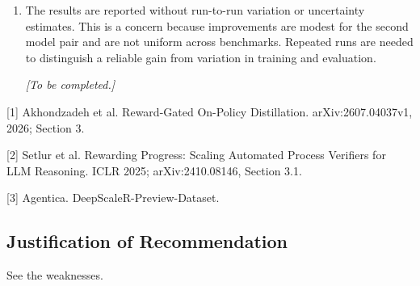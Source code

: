 \documentclass[11pt,a4paper]{article}
\begin{document}
\begin{enumerate}
\item The results are reported without run-to-run variation or uncertainty estimates. This is a concern because improvements are modest for the second model pair and are not uniform across benchmarks. Repeated runs are needed to distinguish a reliable gain from variation in training and evaluation.
\par{}
\begin{responsebox}[frametitle={Response to W5},nobreak=true]
\textit{[To be completed.]}\par\vspace{1em}
\end{responsebox}

\end{enumerate}

[1] Akhondzadeh et al. Reward-Gated On-Policy Distillation. arXiv:2607.04037v1, 2026; Section 3.

[2] Setlur et al. Rewarding Progress: Scaling Automated Process Verifiers for LLM Reasoning. ICLR 2025; arXiv:2410.08146, Section 3.1.

[3] Agentica. DeepScaleR-Preview-Dataset.

\subsection*{Justification of Recommendation}
See the weaknesses.
\end{document}

